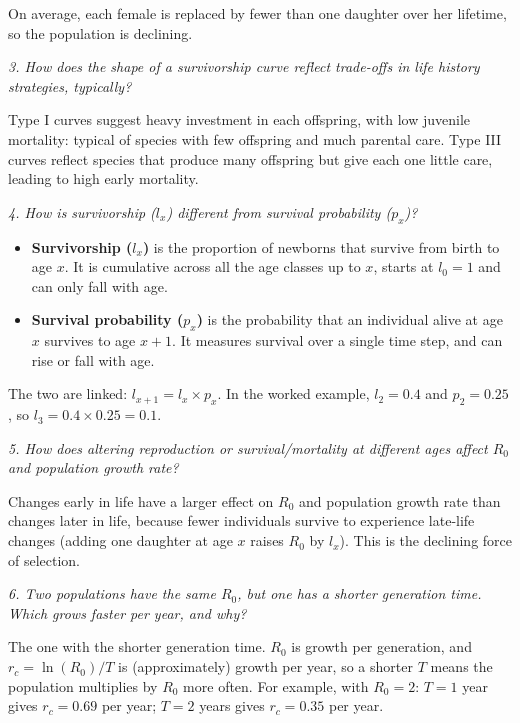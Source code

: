 \documentclass[
  a4paper]{book}
\providecommand{\tightlist}{%
  \setlength{\itemsep}{0pt}\setlength{\parskip}{0pt}}
\begin{document}
On average, each female is replaced by fewer than one daughter over her lifetime, so the population is declining.

\emph{3. How does the shape of a survivorship curve reflect trade-offs in life history strategies, typically?}

Type I curves suggest heavy investment in each offspring, with low juvenile mortality: typical of species with few offspring and much parental care. Type III curves reflect species that produce many offspring but give each one little care, leading to high early mortality.

\emph{4. How is survivorship (\(l_x\)) different from survival probability (\(p_x\))?}

\begin{itemize}
\tightlist
\item
  \textbf{Survivorship (\(l_x\))} is the proportion of newborns that survive from birth to age \(x\). It is cumulative across all the age classes up to \(x\), starts at \(l_0 = 1\) and can only fall with age.
\item
  \textbf{Survival probability (\(p_x\))} is the probability that an individual alive at age \(x\) survives to age \(x+1\). It measures survival over a single time step, and can rise or fall with age.
\end{itemize}

The two are linked: \(l_{x+1} = l_x \times p_x\). In the worked example, \(l_2 = 0.4\) and \(p_2 = 0.25\), so \(l_3 = 0.4 \times 0.25 = 0.1\).

\emph{5. How does altering reproduction or survival/mortality at different ages affect \(R_0\) and population growth rate?}

Changes early in life have a larger effect on \(R_0\) and population growth rate than changes later in life, because fewer individuals survive to experience late-life changes (adding one daughter at age \(x\) raises \(R_0\) by \(l_x\)). This is the declining force of selection.

\emph{6. Two populations have the same \(R_0\), but one has a shorter generation time. Which grows faster per year, and why?}

The one with the shorter generation time. \(R_0\) is growth per generation, and \(r_c = \ln(R_0)/T\) is (approximately) growth per year, so a shorter \(T\) means the population multiplies by \(R_0\) more often. For example, with \(R_0 = 2\): \(T = 1\) year gives \(r_c = 0.69\) per year; \(T = 2\) years gives \(r_c = 0.35\) per year.
\end{document}
